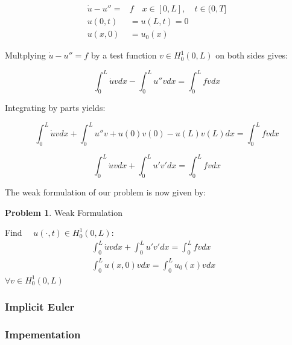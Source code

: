\documentclass{uonmathreport}
\theoremstyle{definition}
\theoremstyle{problem}
\newtheorem{problem}{Problem}[section]
\theoremstyle{theorem}
\begin{document}
\begin{subequations} 
\begin{align}
  \dot{u} - u'' = & f \quad x \in [0, L], \quad t \in (0, T]  \\ \label{eq:Simple Heat}
  u(0, t) & = u(L, t) = 0\\
  u(x, 0) & = u_0(x)   
\end{align}
\end{subequations}

Multplying $\dot{u} - u'' = f$ by a test function  $v \in H^1_0(0, L)$  on both sides gives:

\begin{equation}
  \int_0^L \dot{u} v dx  - \int_0^L  u'' v  dx =   \int_0^L  f v  dx   
\end{equation}

Integrating by parts yields:

\begin{equation}
  \int_0^L \dot{u} v dx  + \int_0^L  u'' v  +u(0)v(0) - u(L)v(L) dx =   \int_0^L  f v  dx   
\end{equation}

\begin{equation}
  \int_0^L \dot{u} v dx +  \int_0^L  u' v'  dx =   \int_0^L  f v  dx    
\end{equation}

The weak formulation of our problem is now given by:

\begin{problem}{Weak Formulation}


Find $\quad u(\cdot, t) \in H^1_0(0, L)$:
\begin{align*}
 \int_0^L \dot{u} v dx +  \int_0^L  u' v'  dx =   \int_0^L  f v  dx& \\
  \int_0^L  u(x, 0) v dx = \int_0^L u_0(x) v dx&  
\end{align*}
$\forall v \in H^1_0(0, L)$

\end{problem}

\newpage




\subsubsection{Implicit Euler} \label{subsubsec:Implicit Euler}


\subsubsection{Impementation} \label{subsubsec:Implementation}
\end{document}
